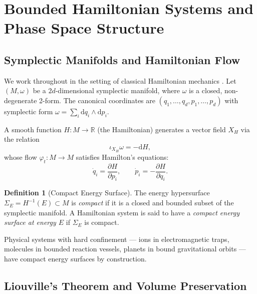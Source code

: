 \documentclass[twocolumn,10pt,a4paper]{article}
\theoremstyle{thmstyle}
\theoremstyle{definition}
\newtheorem{definition}[theorem]{Definition}
\theoremstyle{remark}
\newcommand{\R}{\mathbb{R}}
\begin{document}
\section{Bounded Hamiltonian Systems and Phase Space Structure}
\label{sec:bounded}

\subsection{Symplectic Manifolds and Hamiltonian Flow}

We work throughout in the setting of classical Hamiltonian mechanics \citep{hamilton1835,arnold1989,goldstein2002}. Let $(M, \omega)$ be a $2d$-dimensional symplectic manifold, where $\omega$ is a closed, non-degenerate 2-form. The canonical coordinates are $(q_1,\ldots,q_d, p_1,\ldots,p_d)$ with symplectic form $\omega = \sum_i \mathrm{d}q_i \wedge \mathrm{d}p_i$.

A smooth function $H: M \to \R$ (the Hamiltonian) generates a vector field $X_H$ via the relation
\begin{equation}
    \iota_{X_H} \omega = -\mathrm{d}H,
    \label{eq:ham-vf}
\end{equation}
whose flow $\varphi_t : M \to M$ satisfies Hamilton's equations:
\begin{equation}
    \dot{q}_i = \frac{\partial H}{\partial p_i}, \qquad \dot{p}_i = -\frac{\partial H}{\partial q_i}.
    \label{eq:hamilton}
\end{equation}

\begin{definition}[Compact Energy Surface]
The energy hypersurface $\Sigma_E = H^{-1}(E) \subset M$ is \emph{compact} if it is a closed and bounded subset of the symplectic manifold. A Hamiltonian system is said to have a \emph{compact energy surface at energy $E$} if $\Sigma_E$ is compact.
\end{definition}

Physical systems with hard confinement --- ions in electromagnetic traps, molecules in bounded reaction vessels, planets in bound gravitational orbits --- have compact energy surfaces by construction.

\subsection{Liouville's Theorem and Volume Preservation}
\end{document}
